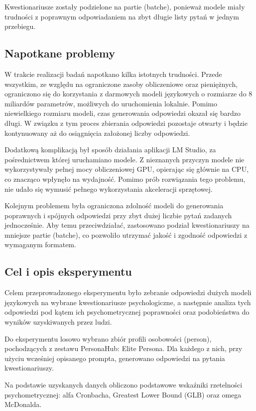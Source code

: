 \documentclass{article}
\begin{document}
Kwestionariusze zostały podzielone na partie (batche), ponieważ modele miały trudności z poprawnym odpowiadaniem na zbyt długie listy pytań w jednym przebiegu.

\subsection{Napotkane problemy}
W trakcie realizacji badań napotkano kilka istotnych trudności. Przede wszystkim, ze względu na ograniczone zasoby obliczeniowe oraz pieniężnych, ograniczono się do korzystania z darmowych modeli językowych o rozmiarze do 8 miliardów parametrów, możliwych do uruchomienia lokalnie. Pomimo niewielkiego rozmiaru modeli, czas generowania odpowiedzi okazał się bardzo długi. W związku z tym proces zbierania odpowiedzi pozostaje otwarty i będzie kontynuowany aż do osiągnięcia założonej liczby odpowiedzi.

Dodatkową komplikacją był sposób działania aplikacji LM Studio, za pośrednictwem której uruchamiano modele. Z nieznanych przyczyn modele nie wykorzystywały pełnej mocy obliczeniowej GPU, opierając się głównie na CPU, co znacząco wpłynęło na wydajność. Pomimo prób rozwiązania tego problemu, nie udało się wymusić pełnego wykorzystania akceleracji sprzętowej.

Kolejnym problemem była ograniczona zdolność modeli do generowania poprawnych i spójnych odpowiedzi przy zbyt dużej liczbie pytań zadanych jednocześnie. Aby temu przeciwdziałać, zastosowano podział kwestionariuszy na mniejsze partie (batche), co pozwoliło utrzymać jakość i zgodność odpowiedzi z wymaganym formatem.

\subsection{Cel i opis eksperymentu}
Celem przeprowadzonego eksperymentu było zebranie odpowiedzi dużych modeli językowych na wybrane kwestionariusze psychologiczne, a następnie analiza tych odpowiedzi pod kątem ich psychometrycznej poprawności oraz podobieństwa do wyników uzyskiwanych przez ludzi.

Do eksperymentu losowo wybrano zbiór profili osobowości (person), pochodzących z zestawu PersonaHub: Elite Persona. Dla każdego z nich, przy użyciu wcześniej opisanego prompta, generowano odpowiedzi na pytania kwestionariuszy.

Na podstawie uzyskanych danych obliczono podstawowe wskaźniki rzetelności psychometrycznej: alfa Cronbacha, Greatest Lower Bound (GLB) oraz omega McDonalda.
\end{document}
